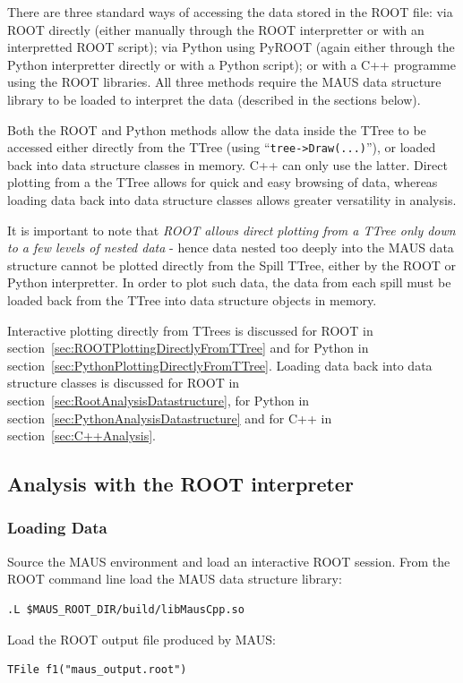 \documentclass[a4paper,10pt]{article}
\begin{document}
  There are three standard ways of accessing the data stored in the ROOT file: via ROOT directly (either manually through the ROOT interpretter or with an interpretted ROOT script); via Python using PyROOT (again either through the Python interpretter directly or with a Python script); or with a C++ programme using the ROOT libraries.  All three methods require the MAUS data structure library to be loaded to interpret the data (described in the sections below).

  Both the ROOT and Python methods allow the data inside the TTree to be accessed either directly from the TTree (using ``\texttt{tree->Draw(...)}''), or loaded back into data structure classes in memory.  C++ can only use the latter.  Direct plotting from a the TTree allows for quick and easy browsing of data, whereas loading data back into data structure classes allows greater versatility in analysis.

  It is important to note that \textit{ROOT allows direct plotting from a TTree only down to a few levels of nested data} - hence data nested too deeply into the MAUS data structure cannot be plotted directly from the Spill TTree, either by the ROOT or Python interpretter. In order to plot such data, the data from each spill must be loaded back from the TTree into data structure objects in memory. 

  Interactive plotting directly from TTrees is discussed for ROOT in section~\ref{sec:ROOTPlottingDirectlyFromTTree} and for Python in section~\ref{sec:PythonPlottingDirectlyFromTTree}. Loading data back into data structure classes is discussed for ROOT in section~\ref{sec:RootAnalysisDatastructure}, for Python in section~\ref{sec:PythonAnalysisDatastructure} and for C++ in section~\ref{sec:C++Analysis}.

\lstset{style=customcpp}

  \subsection{Analysis with the ROOT interpreter}
  \label{sec:RootAnalysis}

  \subsubsection{Loading Data}
  Source the MAUS environment and load an interactive ROOT session.  From the ROOT command line load the MAUS data structure library:
  \begin{lstlisting}
.L $MAUS_ROOT_DIR/build/libMausCpp.so
  \end{lstlisting}
  Load the ROOT output file produced by MAUS:
  \begin{lstlisting}
TFile f1("maus_output.root")
  \end{lstlisting}
\end{document}

